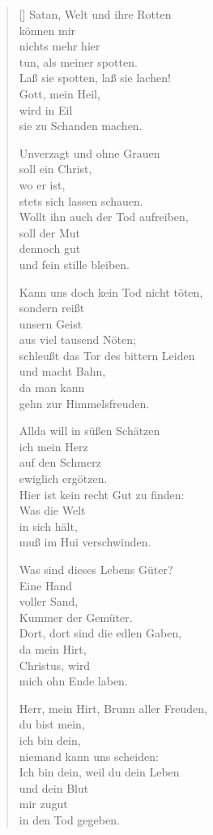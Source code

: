 \begin{multicols}{2}
\begin{verse}[\versewidth]
 Satan, Welt und ihre Rotten\\
können mir\\
nichts mehr hier\\
tun, als meiner spotten.\\
Laß sie spotten, laß sie lachen!\\
Gott, mein Heil,\\
wird in Eil\\
sie zu Schanden machen.

 Unverzagt und ohne Grauen\\
soll ein Christ,\\
wo er ist,\\
stets sich lassen schauen.\\
Wollt ihn auch der Tod aufreiben,\\
soll der Mut\\
dennoch gut\\
und fein stille bleiben.

 Kann uns doch kein Tod nicht töten,\\
sondern reißt\\
unsern Geist\\
aus viel tausend Nöten;\\
schleußt das Tor des bittern Leiden\\
und macht Bahn,\\
da man kann\\
gehn zur Himmelsfreuden.

 Allda will in süßen Schätzen\\
ich mein Herz\\
auf den Schmerz\\
ewiglich ergötzen.\\
Hier ist kein recht Gut zu finden:\\
Was die Welt\\
in sich hält,\\
muß im Hui verschwinden.

 Was sind dieses Lebens Güter?\\
Eine Hand\\
voller Sand,\\
Kummer der Gemüter.\\
Dort, dort sind die edlen Gaben,\\
da mein Hirt,\\
Christus, wird\\
mich ohn Ende laben.

 Herr, mein Hirt, Brunn aller Freuden,\\
du bist mein,\\
ich bin dein,\\
niemand kann uns scheiden:\\
Ich bin dein, weil du dein Leben\\
und dein Blut\\
mir zugut\\
in den Tod gegeben.


\end{verse}
\end{multicols}
